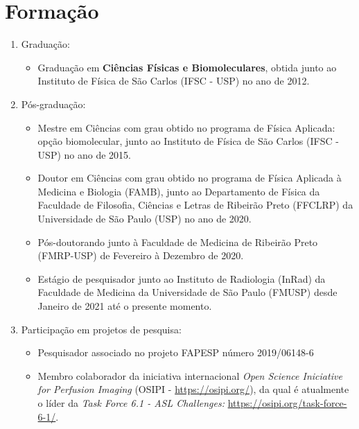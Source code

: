 \documentclass[a4paper,oneside,10pt]{article}
\begin{document}
\section{Formação}
\large{
\begin{enumerate}
        \item Graduação:
        \begin{itemize}
                \item Graduação em \textbf{Ciências Físicas e Biomoleculares}, obtida junto ao Instituto de Física de São Carlos (IFSC - USP) no ano de 2012. \mbox{} \\
        \end{itemize}

        \item Pós-graduação:
        \begin{itemize}
                \item Mestre em Ciências com grau obtido no programa de Física Aplicada: opção biomolecular, junto ao Instituto de Física de São Carlos (IFSC - USP) no ano de 2015. \mbox{} \\
                \item Doutor em Ciências com grau obtido no programa de Física Aplicada à Medicina e Biologia (FAMB), junto ao Departamento de Física da Faculdade de Filosofia, Ciências e Letras de Ribeirão Preto (FFCLRP) da Universidade de São Paulo (USP) no ano de 2020. \mbox{} \\
                \item Pós-doutorando junto à Faculdade de Medicina de Ribeirão Preto (FMRP-USP) de Fevereiro à Dezembro de 2020. \mbox{}
                \item Estágio de pesquisador junto ao Instituto de Radiologia (InRad) da Faculdade de Medicina da Universidade de São Paulo (FMUSP) desde Janeiro de 2021 até o presente momento. \mbox{} 
        \end{itemize}

        \item Participação em projetos de pesquisa:
        \begin{itemize}
                \item Pesquisador associado no projeto FAPESP número 2019/06148-6 \mbox{} \\
                \item Membro colaborador da iniciativa internacional \textit{Open Science Iniciative for Perfusion Imaging} (OSIPI - \url{https://osipi.org/}), da qual é atualmente o líder 
        da \textit{Task Force 6.1 - ASL Challenges:} \url{https://osipi.org/task-force-6-1/}.
        \end{itemize}


\end{enumerate}}
\end{document}

